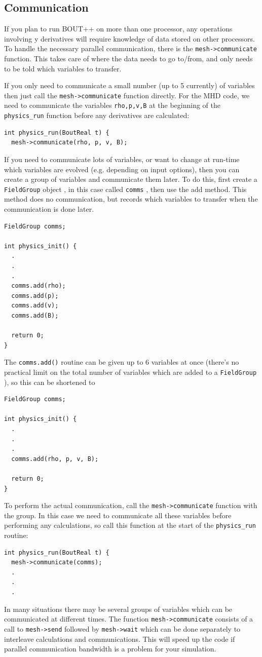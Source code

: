 \documentclass[12pt]{article}
\newcommand{\code}[1]{\texttt{#1}}
\begin{document}
\subsection{Communication}
%
%
If you plan to run BOUT++ on more than one processor, any operations involving
y derivatives will require knowledge of data stored on other processors. To
handle the necessary parallel communication, there is the
\code{mesh->communicate} function. This takes care of where the data needs to
go to/from, and only needs to be told which variables to transfer.

If you only need to communicate a small number (up to 5 currently) of variables
then just call the \code{mesh->communicate} function directly. For the MHD
code, we need to communicate the variables \code{rho,p,v,B} at the beginning of
the \code{physics\_run} function before any derivatives are calculated:
%
\begin{lstlisting}
int physics_run(BoutReal t) {
  mesh->communicate(rho, p, v, B);
\end{lstlisting}
%
If you need to communicate lots of variables, or want to change at run-time
which variables are evolved (e.g. depending on input options), then you can
create a group of variables and communicate them later.  To do this, first
create a \code{FieldGroup} object
%
, in this case called \code{comms}
%
, then use the add method. This method does no communication, but records which
variables to transfer when the communication is done later.
%
\begin{lstlisting}
FieldGroup comms;

int physics_init() {
  .
  .
  .
  comms.add(rho);
  comms.add(p);
  comms.add(v);
  comms.add(B);

  return 0;
}
\end{lstlisting}
%
The
%
\lstinline!comms.add()!
%
 routine can be given up to 6 variables at once (there's no practical limit on
 the total number of variables which are added to a
%
\lstinline!FieldGroup!
%
), so this can be shortened to
%
\begin{lstlisting}
FieldGroup comms;

int physics_init() {
  .
  .
  .
  comms.add(rho, p, v, B);

  return 0;
}
\end{lstlisting}
%
To perform the actual communication, call the \code{mesh->communicate} function
with the group. In this case we need to communicate all these variables before
performing any calculations, so call this function at the start of the
\code{physics\_run} routine:
%
\begin{lstlisting}
int physics_run(BoutReal t) {
  mesh->communicate(comms);
  .
  .
  .
\end{lstlisting}
%
In many situations there may be several groups of variables which can be
communicated at different times. The function \code{mesh->communicate} consists
of a call to \code{mesh->send} followed by \code{mesh->wait} which can be done
separately to interleave calculations and communications. This will speed up
the code if parallel communication bandwidth is a problem for your simulation.
\end{document}
